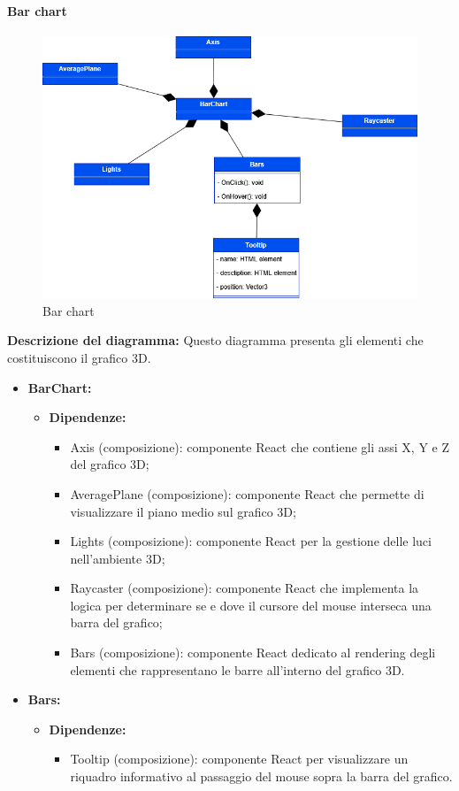 \paragraph{Bar chart}
\begin{figure}[h!] \centering
    \includegraphics[scale=0.45]{template/images/uml_front/ui/barchart.png}
    \caption{Bar chart}
\end{figure}
\textbf{Descrizione del diagramma:}
Questo diagramma presenta gli elementi che costituiscono il grafico 3D.
\begin{itemize}
    \item \textbf{BarChart:}
    \begin{itemize}
        \item \textbf{Dipendenze:}
        \begin{itemize}
            \item Axis (composizione): componente React che contiene gli assi X, Y e Z del grafico 3D;
            \item AveragePlane (composizione): componente React che permette di visualizzare il piano medio sul grafico 3D;
            \item Lights (composizione): componente React per la gestione delle luci nell'ambiente 3D;
            \item Raycaster (composizione): componente React che implementa la logica per determinare se e dove il cursore del mouse interseca una barra del grafico;
            \item Bars (composizione): componente React dedicato al rendering degli elementi che rappresentano le barre all'interno del grafico 3D.
        \end{itemize} 
    \end{itemize}

    \item \textbf{Bars:}
    \begin{itemize}
        \item \textbf{Dipendenze:}
        \begin{itemize}
            \item Tooltip (composizione): componente React per visualizzare un riquadro informativo al passaggio del mouse sopra la barra del grafico.
        \end{itemize} 
    \end{itemize}
\end{itemize}

